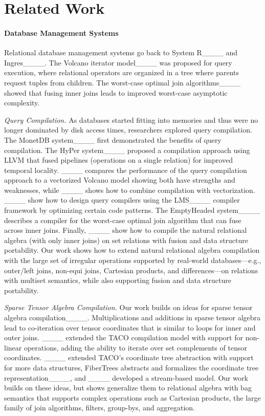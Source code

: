 \section{Related Work}
\label{sec:related-work}

\paragraph{Database Management Systems}

Relational database management systems go back to System R____ and Ingres____. The Volcano iterator model____ was proposed for query execution, where relational operators are organized in a tree where parents request tuples from children.  The worst-case optimal join algorithms____ showed that fusing inner joins leads to improved worst-case asymptotic complexity.

\emph{Query Compilation.}
As databases started fitting into memories and thus were no longer dominated by disk access times, researchers explored query compilation. The MonetDB system____ first demonstrated the benefits of query compilation. The HyPer system____ proposed a compilation approach using LLVM that fused pipelines (operations on a single relation) for improved temporal locality. ____ compares the performance of the query compilation approach to a vectorized Volcano model showing both have strengths and weaknesses, while ____ shows how to combine compilation with vectorization. ____ show how to design query compilers using the LMS____ compiler framework by optimizing certain code patterns. The EmptyHeaded system____ describes a compiler for the worst-case optimal join algorithm that can fuse across inner joins. Finally, ____ show how to compile the natural relational algebra (with only inner joins) on set relations with fusion and data structure portability. Our work shows how to extend natural relational algebra compilation with the large set of irregular operations supported by real-world databases---e.g., outer/left joins, non-equi joins, Cartesian products, and differences---on relations with multiset semantics, while also supporting fusion and data structure portability.

\emph{Sparse Tensor Algebra Compilation.}
Our work builds on ideas for sparse tensor algebra compilation____. Multiplications and additions in sparse tensor algebra lead to co-iteration over tensor coordinates that is similar to loops for inner and outer joins. ____ extended the TACO compilation model with support for non-linear operations, adding the ability to iterate over set complements of tensor coordinates. ____ extended TACO's coordinate tree abstraction with support for more data structures,
FiberTrees abstracts and formalizes the coordinate tree representation____, and ____ developed a stream-based model. Our work builds on these ideas, but shows generalize them to relational algebra with bag semantics that supports complex operations such as Cartesian products, the large family of join algorithms, filters, group-bys, and aggregation.